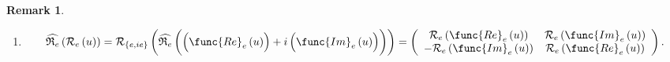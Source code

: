 \documentclass[aps,preprint]{revtex4}
\newtheorem{remark}[theorem]{Remark}
\begin{document}
\begin{remark}
\begin{enumerate}
\begin{eqnarray}
\begin{array}{cc}
u\right) \right)%
\end{array}%
\right) \right) \left\langle \mathbf{e,}i\mathbf{e}\right\vert ,
\end{eqnarray}%
where%
\begin{equation}
\mathcal{R}_{\left\{ e,ie\right\} }\left( \overset{}{\widehat{\mathfrak{R}%
_{e}}\left( u\right) }\right) =\left( 
\begin{array}{cc}
\mathcal{R}_{\left\{ e,ie\right\} }\left( \widehat{\mathfrak{R}_{e}}\left( 
\func{Re}_{e}\left( u\right) \right) \right) & \mathcal{R}_{\left\{
e,ie\right\} }\left( \widehat{\mathfrak{R}_{e}}\left( \func{Im}_{e}\left(
u\right) \right) \right) \\ 
-\mathcal{R}_{\left\{ e,ie\right\} }\left( \widehat{\mathfrak{R}_{e}}\left( 
\func{Im}_{e}\left( u\right) \right) \right) & \mathcal{R}_{\left\{
e,ie\right\} }\left( \widehat{\mathfrak{R}_{e}}\left( \func{Re}_{e}\left(
u\right) \right) \right)%
\end{array}%
\right) .
\end{equation}

\item 
\begin{equation}
\widehat{\mathfrak{R}_{e}}\left( \mathcal{R}_{e}\left( u\right) \right) =%
\mathcal{R}_{\left\{ e,ie\right\} }\left( \widehat{\mathfrak{R}_{e}}\left( 
\overset{}{\left( \overset{}{\func{Re}_{e}\left( u\right) }\right) +i\left( 
\overset{}{\func{Im}_{e}\left( u\right) }\right) }\right) \right) =\left( 
\begin{array}{cc}
\mathcal{R}_{e}\left( \func{Re}_{e}\left( u\right) \right) & \mathcal{R}%
_{e}\left( \func{Im}_{e}\left( u\right) \right) \\ 
-\mathcal{R}_{e}\left( \func{Im}_{e}\left( u\right) \right) & \mathcal{R}%
_{e}\left( \func{Re}_{e}\left( u\right) \right)%
\end{array}%
\right) .
\end{equation}


\end{enumerate}
\end{remark}
\end{document}
